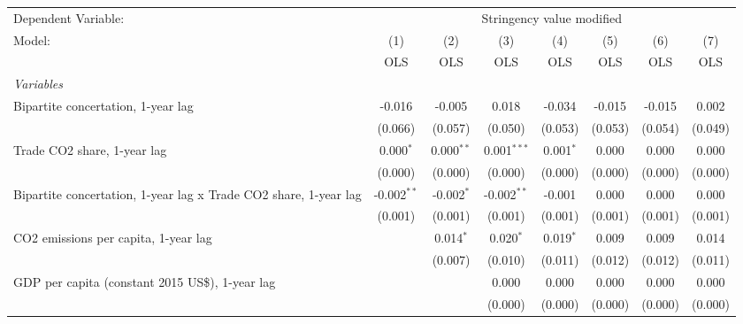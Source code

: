 
\begingroup
\centering
\begin{tabular}{lccccccc}
   \toprule
   Dependent Variable: & \multicolumn{7}{c}{Stringency value modified}\\
   Model:                                                           & (1)           & (2)          & (3)           & (4)         & (5)     & (6)     & (7)\\  
                                                                    &  OLS          & OLS          & OLS           & OLS         & OLS     & OLS     & OLS\\  
   \midrule
   \emph{Variables}\\
   Bipartite concertation, 1-year lag                               & -0.016        & -0.005       & 0.018         & -0.034      & -0.015  & -0.015  & 0.002\\   
                                                                    & (0.066)       & (0.057)      & (0.050)       & (0.053)     & (0.053) & (0.054) & (0.049)\\   
   Trade CO2 share, 1-year lag                                      & 0.000$^{*}$   & 0.000$^{**}$ & 0.001$^{***}$ & 0.001$^{*}$ & 0.000   & 0.000   & 0.000\\   
                                                                    & (0.000)       & (0.000)      & (0.000)       & (0.000)     & (0.000) & (0.000) & (0.000)\\   
   Bipartite concertation, 1-year lag x Trade CO2 share, 1-year lag & -0.002$^{**}$ & -0.002$^{*}$ & -0.002$^{**}$ & -0.001      & 0.000   & 0.000   & 0.000\\   
                                                                    & (0.001)       & (0.001)      & (0.001)       & (0.001)     & (0.001) & (0.001) & (0.001)\\   
   CO2 emissions per capita, 1-year lag                             &               & 0.014$^{*}$  & 0.020$^{*}$   & 0.019$^{*}$ & 0.009   & 0.009   & 0.014\\   
                                                                    &               & (0.007)      & (0.010)       & (0.011)     & (0.012) & (0.012) & (0.011)\\   
   GDP per capita (constant 2015 US\$), 1-year lag                  &               &              & 0.000         & 0.000       & 0.000   & 0.000   & 0.000\\   
                                                                    &               &              & (0.000)       & (0.000)     & (0.000) & (0.000) & (0.000)\\   

\end{tabular}
